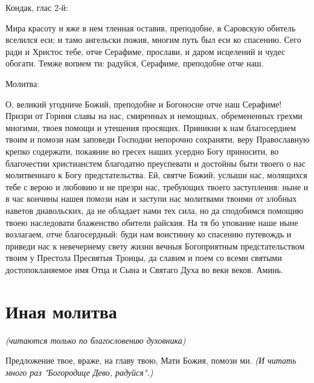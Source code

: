 \bfseries 

Кондак, глас 2-й:\normalfont{}


Мира красоту и яже в нем тленная оставив, преподобне, в Саровскую обитель вселился еси; и тамо ангельски пожив, многим путь был еси ко спасению. Сего ради и Христос тебе, отче Серафиме, прослави, и даром исцелений и чудес обогати. Темже вопием ти: радуйся, Серафиме, преподобне отче наш. 

\bfseries 

Молитва:\normalfont{}


О, великий угодниче Божий, преподобне и Богоносне отче наш Серафиме! Призри от Горния славы на нас, смиренных и немощных, обремененных грехми многими, твоея помощи и утешения просящих. Приникни к нам благосердием твоим и помози нам заповеди Господни непорочно сохраняти, веру Православную крепко содержати, покаяние во гресех наших усердно Богу приносити, во благочестии христианстем благодатно преуспевати и достойны быти твоего о нас молитвеннаго к Богу предстательства. Ей, святче Божий, услыши нас, молящихся тебе с верою и любовию и не презри нас, требующих твоего заступления: ныне и в час кончины нашея помози нам и заступи нас молитвами твоими от злобных наветов диавольских, да не обладает нами тех сила, но да сподобимся помощию твоею наследовати блаженство обители райския. На тя бо упование наше ныне возлагаем, отче благосердный: буди нам воистинну ко спасению путевождь и приведи нас к невечернему свету жизни вечныя Богоприятным предстательством твоим у Престола Пресвятыя Троицы, да славим и поем со всеми святыми достопокланяемое имя Отца и Сына и Святаго Духа во веки веков. Аминь. 


\mychapterending


 

\section{Иная молитва}
 


\itshape (читаются только по благословению духовника)

\normalfont{}


Предложение твое, враже, на главу твою, Мати Божия, помози ми. \itshape (И читать много раз "Богородице Дево, радуйся".)

\normalfont{}


